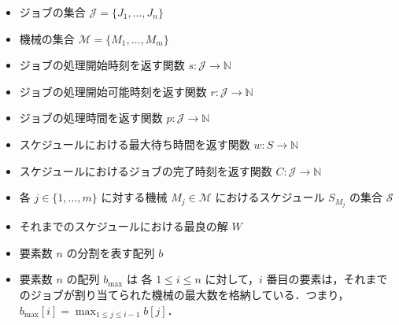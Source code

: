 \documentclass[12pt]{optlab-bachelor}
\begin{document}
\begin{itemize}
  \item ジョブの集合 $\mathcal{J} = \{J_1,\ldots,J_n\}$
  \item 機械の集合 $\mathcal{M} = \{M_1,\ldots,M_m\}$
  \item ジョブの処理開始時刻を返す関数 $s : \mathcal{J} \to \mathbb{N}$
  \item ジョブの処理開始可能時刻を返す関数 $r : \mathcal{J} \to \mathbb{N}$
  \item ジョブの処理時間を返す関数 $p : \mathcal{J} \to \mathbb{N}$
  \item スケジュールにおける最大待ち時間を返す関数 $w : S \to \mathbb{N}$
  \item スケジュールにおけるジョブの完了時刻を返す関数 $C : \mathcal{J} \to \mathbb{N}$
  \item 各 $j \in \{1,\ldots,m\}$ に対する機械 $M_j \in \mathcal{M}$ におけるスケジュール $S_{M_j}$ の集合 $\mathcal{S}$
  \item それまでのスケジュールにおける最良の解 $W$
  \item 要素数 $n$ の分割を表す配列 $b$
  \item 要素数 $n$ の配列 $b_{\max}$ は 各 $1 \le i \le n$ に対して，$i$ 番目の要素は，それまでのジョブが割り当てられた機械の最大数を格納している．つまり，$b_{\max}[i] = \displaystyle \max_{1\le j \le i - 1}b[j]$．
\end{itemize}
\end{document}
